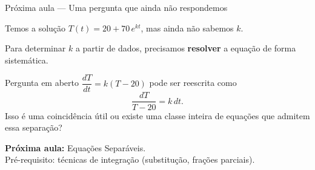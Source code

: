 \documentclass[12pt]{beamer}
\begin{document}
\begin{frame}{Próxima aula — Uma pergunta que ainda não respondemos}

  Temos a solução $T(t) = 20 + 70\,e^{kt}$, mas ainda não sabemos $k$.

  \vspace{10pt}
  Para determinar $k$ a partir de dados, precisamos \textbf{resolver} a equação
  de forma sistemática.

  \vspace{10pt}
  \pause

  \begin{alertblock}{Pergunta em aberto}
    $\dfrac{dT}{dt} = k(T - 20)$ pode ser reescrita como
    \[
      \frac{dT}{T - 20} = k\,dt.
    \]
    \vspace{4pt}
    Isso é uma coincidência útil ou existe uma classe inteira de
    equações que admitem essa separação?
  \end{alertblock}

  \vspace{10pt}
  \pause

  \begin{center}
    \textbf{Próxima aula:} Equações Separáveis.\\[4pt]
    \small Pré-requisito: técnicas de integração (substitução, frações parciais).
  \end{center}

\end{frame}

\end{document}
